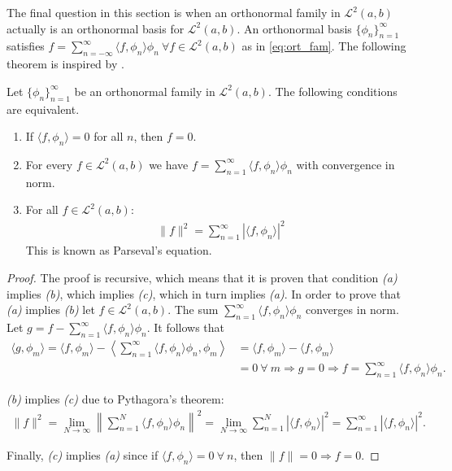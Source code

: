 The final question in this section is when an orthonormal family in $\mathcal{L}^2(a,b)$ actually is an orthonormal basis for $\mathcal{L}^2(a,b)$. An orthonormal basis $\{\phi_n\}_{n=1}^\infty$ satisfies $f = \sum_{n=-\infty}^\infty \langle f, \phi_n \rangle \phi_n \ \forall f \in \mathcal{L}^2(a,b)$ as in \eqref{eq:ort_fam}. The following theorem is inspired by \cite{page 77, FAA}.

\begin{theorem} \label{theo:Fourier_series_Parseval}
Let $\{\phi_n\}_{n=1}^\infty$ be an orthonormal family in $\mathcal{L}^2(a,b)$. The following conditions are equivalent.
\begin{enumerate}[label=(\alph*)]
\item If $\langle f, \phi_n \rangle = 0$ for all $n$, then $f = 0$.
\item For every $f \in \mathcal{L}^2(a,b)$ we have $f = \sum_{n=1}^\infty \langle f, \phi_n \rangle \phi_n$ with convergence in norm.\\
\item For all $f \in \mathcal{L}^2(a,b)$:
\begin{align*}
\|f\|^2 = \sum_{n=1}^\infty |\langle f,\phi_n \rangle|^2
\end{align*}
This is known as Parseval's equation.
\end{enumerate}
\end{theorem}

\begin{proof}
The proof is recursive, which means that it is proven that condition \textit{(a)} implies \textit{(b)}, which implies \textit{(c)}, which in turn implies \textit{(a)}. In order to prove that \textit{(a)} implies \textit{(b)} let $f\in\mathcal{L}^2(a,b)$. The sum $\sum_{n=1}^\infty \langle f,\phi_n \rangle \phi_n$ converges in norm. Let $g = f - \sum_{n=1}^\infty \langle f,\phi_n \rangle \phi_n$. It follows that
\begin{align*}
\langle g,\phi_m \rangle = \langle f, \phi_m \rangle - \left\langle \sum_{n=1}^\infty \langle f,\phi_n\rangle \phi_n, \phi_m \right\rangle &= \langle f, \phi_m \rangle - \langle f, \phi_m \rangle \\
&= 0 \ \forall \ m \Rightarrow g = 0 \Rightarrow f = \sum_{n=1}^\infty \langle f,\phi_n \rangle \phi_n.
\end{align*}

\textit{(b)} implies \textit{(c)} due to Pythagora's theorem:
\begin{align*}
\|f\|^2 = \lim_{N\to\infty} \left\| \sum_{n=1}^N \langle f,\phi_n \rangle \phi_n \right\|^2 = \lim_{N\to\infty} \sum_{n=1}^N |\langle f,\phi_n \rangle|^2 = \sum_{n=1}^\infty |\langle f,\phi_n \rangle|^2.
\end{align*}

Finally, \textit{(c)} implies \textit{(a)} since if $\langle f,\phi_n \rangle = 0 \ \forall \ n$, then $\|f\| = 0 \Rightarrow f = 0$.
\end{proof}


